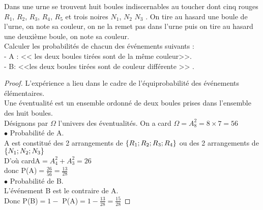  \begin{exercice}
   Dans une urne se trouvent huit boules  indiscernables au toucher dont cinq rouges $ R_{1} $, $ R_{2} $, $ R_{3} $,  $ R_{4} $, $ R_{5} $  et trois noires $ N_{1} $, $ N_{2} $ $ N_{3} $ .
On tire au hasard une boule de l’urne, on note sa couleur, on ne la remet pas dans l'urne puis on tire au hasard une deuxième boule, on note sa couleur. \\ Calculer  les  probabilités de chacun des  événements suivants :\\
- A : << les deux boules tirées sont de la même couleur>>.\\ 
- B: <<les deux boules tirées sont de couleur différente >> . 
 \end{exercice}
 \begin{proof}
 L'expérience a lieu dans le cadre de l'équiprobabilité des événements élémentaires.\\ Une éventualité est un ensemble ordonné de deux boules prises dans l'ensemble des huit boules.\\
 Désignons par $ \Omega $  l'univers des éventualités. On a card $\Omega=A_{8}^{2}=8\times 7=56$\\

 $ \bullet $ Probabilité de A.\\

 A est constitué des 2 arrangements de $ \left\{R_{1}; R_{2} ;R_{3} ;R_{4} \right\} $ ou des 2 arrangements de $ \left\{N_{1}; N_{2} ;N_{3}\right\} $\\
 
 D'où cardA$ =A_{4}^{2}+A_{3}^{2} =26$\\
 
 donc P(A)$ =\frac{26}{56}=\frac{13}{28}$\\
 
  $ \bullet $ Probabilité de B.\\

L'événement B est le contraire de A.\\

Donc P(B)$ =1- $ P(A)$ =1-\frac{13}{28}=\frac{15}{28} $

 \end{proof}

